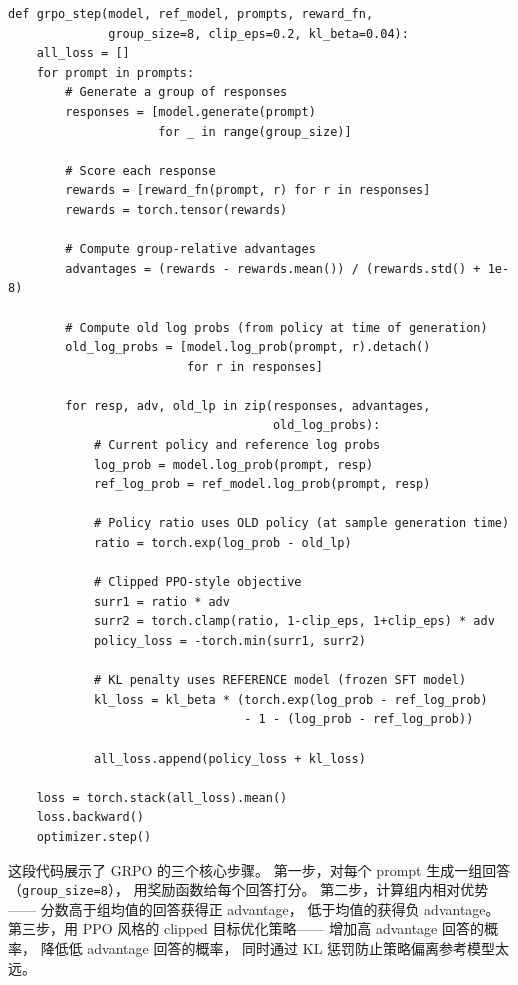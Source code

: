 \begin{lstlisting}[caption={GRPO training step (simplified)}]
def grpo_step(model, ref_model, prompts, reward_fn,
              group_size=8, clip_eps=0.2, kl_beta=0.04):
    all_loss = []
    for prompt in prompts:
        # Generate a group of responses
        responses = [model.generate(prompt)
                     for _ in range(group_size)]

        # Score each response
        rewards = [reward_fn(prompt, r) for r in responses]
        rewards = torch.tensor(rewards)

        # Compute group-relative advantages
        advantages = (rewards - rewards.mean()) / (rewards.std() + 1e-8)

        # Compute old log probs (from policy at time of generation)
        old_log_probs = [model.log_prob(prompt, r).detach()
                         for r in responses]

        for resp, adv, old_lp in zip(responses, advantages,
                                     old_log_probs):
            # Current policy and reference log probs
            log_prob = model.log_prob(prompt, resp)
            ref_log_prob = ref_model.log_prob(prompt, resp)

            # Policy ratio uses OLD policy (at sample generation time)
            ratio = torch.exp(log_prob - old_lp)

            # Clipped PPO-style objective
            surr1 = ratio * adv
            surr2 = torch.clamp(ratio, 1-clip_eps, 1+clip_eps) * adv
            policy_loss = -torch.min(surr1, surr2)

            # KL penalty uses REFERENCE model (frozen SFT model)
            kl_loss = kl_beta * (torch.exp(log_prob - ref_log_prob)
                                 - 1 - (log_prob - ref_log_prob))

            all_loss.append(policy_loss + kl_loss)

    loss = torch.stack(all_loss).mean()
    loss.backward()
    optimizer.step()
\end{lstlisting}

这段代码展示了 GRPO 的三个核心步骤。
第一步，对每个 prompt 生成一组回答（\texttt{group\_size=8}），
用奖励函数给每个回答打分。
第二步，计算组内相对优势——
分数高于组均值的回答获得正 advantage，
低于均值的获得负 advantage。
第三步，用 PPO 风格的 clipped 目标优化策略——
增加高 advantage 回答的概率，
降低低 advantage 回答的概率，
同时通过 KL 惩罚防止策略偏离参考模型太远。

